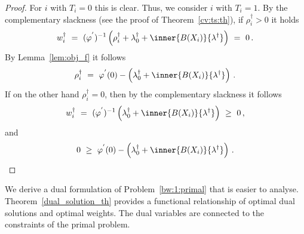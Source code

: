 \begin{proof}
  For $i$ with $T_i=0$ this is clear.
  Thus, we consider $i$ with $T_i=1$.
  By the complementary slackness (see the proof of Theorem~\ref{cv:ts:th}), if $\rho_i^\dagger>0$ it holds
  \begin{align*}
    w_i^\dagger
    \ 
    =
    \ 
    (
    \varphi^{'}
    )^{-1}
\left( 
  \rho_i^\dagger
  +
    \lambda_0^\dagger + \inner{B(X_i)}{\lambda^\dagger}
\right)
    \ 
=
    \ 
0
\,.
  \end{align*}
  By Lemma~\ref{lem:obj_f} it follows
  \begin{align*}
    \rho_i^\dagger
    \ 
    =
    \ 
    \varphi^{'}
    (0)
    -
    \left( 
    \lambda_0^\dagger + \inner{B(X_i)}{\lambda^\dagger}
    \right)
    \,.
  \end{align*}
  If on the other hand $\rho_i^\dagger=0$, then by the complementary slackness it follows
  \begin{align*}
    w_i^\dagger
    \ 
    =
    \ 
    (
    \varphi^{'}
    )^{-1}
\left( 
    \lambda_0^\dagger + \inner{B(X_i)}{\lambda^\dagger}
\right)
    \ 
\ge 
    \ 
0
\,,
  \end{align*}
  and
  \begin{align*}
    0
    \ 
    \ge
    \ 
    \varphi^{'}
    (0)
    -
    \left( 
    \lambda_0^\dagger + \inner{B(X_i)}{\lambda^\dagger}
    \right)
    \,.
  \end{align*}
\end{proof}
\begin{takeaways}
  We derive a dual formulation of Problem~\ref{bw:1:primal} that is easier to analyse.
  Theorem~\ref{dual_solution_th} provides a functional relationship of optimal dual solutions and 
  optimal weights.
  The dual variables are connected to the constraints of the primal problem.
\end{takeaways}
